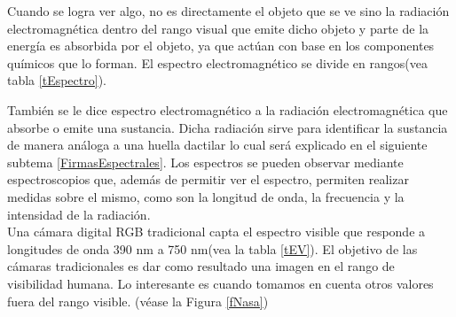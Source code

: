 Cuando se logra ver algo, no es directamente el objeto que se ve sino la radiación electromagnética dentro del rango visual que emite dicho objeto y parte de la energía es absorbida por el objeto, ya que actúan con base en los componentes químicos que lo forman. El espectro electromagnético se divide en rangos(vea tabla \ref{tEspectro}). 

También se le dice espectro electromagnético a la radiación electromagnética que absorbe o emite una sustancia. Dicha radiación sirve para identificar la sustancia de manera análoga a una huella dactilar lo cual será explicado en el siguiente subtema \ref{FirmasEspectrales}. Los espectros se pueden observar mediante espectroscopios que, además de permitir ver el espectro, permiten realizar medidas sobre el mismo, como son la longitud de onda, la frecuencia y la intensidad de la radiación.\\
Una cámara digital RGB tradicional capta el espectro visible que responde a longitudes de onda 390 nm a 750 nm(vea la tabla \ref{tEV}). El objetivo de las cámaras tradicionales es dar como resultado una imagen en el rango de visibilidad humana. Lo interesante es cuando tomamos en cuenta otros valores fuera del rango visible. (véase la Figura \ref{fNasa})

